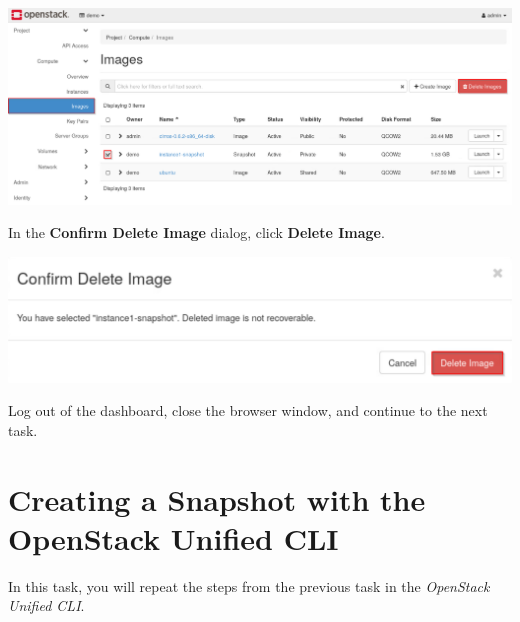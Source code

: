 \documentclass[letterpaper, 12pt]{article}
\begin{document}
\begin{enumerate}
\begin{labstep}
        \begin{center}
            \includegraphics[width=\linewidth]{images/part1/step20.png}
        \end{center}
    \end{labstep}

    \begin{labstep}
        In the \textbf{Confirm Delete Image} dialog, click \textbf{Delete Image}.

        \begin{center}
            \includegraphics[width=\linewidth]{images/part1/step21.png}
        \end{center}
    \end{labstep}

    \begin{labstep}
        Log out of the dashboard, close the browser window, and continue to the next task.
    \end{labstep}
\end{enumerate}

\section{Creating a Snapshot with the OpenStack Unified CLI}\label{sec:creating-a-snapshot-with-the-openstack-unified-cli}
In this task, you will repeat the steps from the previous task in the \textit{OpenStack Unified CLI}.
\end{document}
